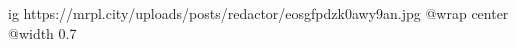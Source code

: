  
 
 
 
 

\ifcmt
  ig https://mrpl.city/uploads/posts/redactor/eosgfpdzk0awy9an.jpg
  @wrap center
  @width 0.7
\fi

